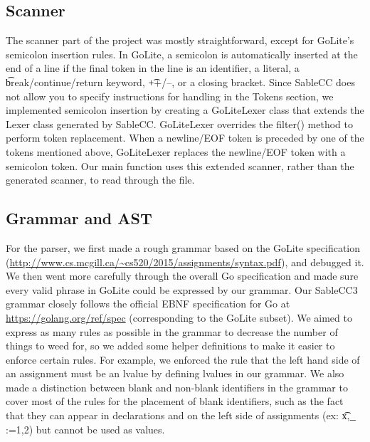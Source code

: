 \documentclass[11pt]{article}
\begin{document}
\subsection{Scanner}
The scanner part of the project was mostly straightforward, except for GoLite's semicolon insertion rules. In GoLite, a semicolon is automatically inserted at the end of a line if the final token in the line is an identifier, a literal, a \t{break/continue/return} keyword, \t{++/--}, or a closing bracket. Since SableCC does not allow you to specify instructions for handling in the Tokens section, we implemented semicolon insertion by creating a GoLiteLexer class that extends the Lexer class generated by SableCC. GoLiteLexer overrides the filter() method to perform token replacement. When a newline/EOF token is preceded by one of the tokens mentioned above, GoLiteLexer replaces the newline/EOF token with a semicolon token. Our main function uses this extended scanner, rather than the generated scanner, to read through the file. 


\subsection{Grammar and AST}
For the parser, we first made a rough grammar based on the GoLite specification (\url{http://www.cs.mcgill.ca/~cs520/2015/assignments/syntax.pdf}), and debugged it. We then went more carefully through the overall Go specification and made sure every valid phrase in GoLite could be expressed by our grammar. Our SableCC3 grammar closely follows the official EBNF specification for Go at \url{https://golang.org/ref/spec} (corresponding to the GoLite subset). We aimed to express as many rules as possible in the grammar to decrease the number of things to weed for, so we added some helper definitions to make it easier to enforce certain rules. For example, we enforced the rule that the left hand side of an assignment must be an lvalue by defining lvalues in our grammar. We also made a distinction between blank and non-blank identifiers in the grammar to cover most of the rules for the placement of blank identifiers, such as the fact that they can appear in declarations and on the left side of assignments (ex: \t{x,$\underline{\hspace{2mm}}$:=1,2}) but cannot be used as values. 
\end{document}
